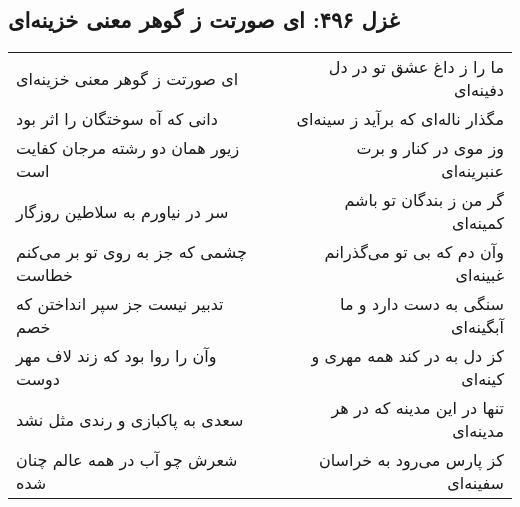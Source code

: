 \begin{center}
\section*{غزل ۴۹۶: ای صورتت ز گوهر معنی خزینه‌ای}
\label{sec:496}
\begin{longtable}{l p{0.5cm} r}
ای صورتت ز گوهر معنی خزینه‌ای
&&
ما را ز داغ عشق تو در دل دفینه‌ای
\\
دانی که آه سوختگان را اثر بود
&&
مگذار ناله‌ای که برآید ز سینه‌ای
\\
زیور همان دو رشته مرجان کفایت است
&&
وز موی در کنار و برت عنبرینه‌ای
\\
سر در نیاورم به سلاطین روزگار
&&
گر من ز بندگان تو باشم کمینه‌ای
\\
چشمی که جز به روی تو بر می‌کنم خطاست
&&
وآن دم که بی تو می‌گذرانم غبینه‌ای
\\
تدبیر نیست جز سپر انداختن که خصم
&&
سنگی به دست دارد و ما آبگینه‌ای
\\
وآن را روا بود که زند لاف مهر دوست
&&
کز دل به در کند همه مهری و کینه‌ای
\\
سعدی به پاکبازی و رندی مثل نشد
&&
تنها در این مدینه که در هر مدینه‌ای
\\
شعرش چو آب در همه عالم چنان شده
&&
کز پارس می‌رود به خراسان سفینه‌ای
\\
\end{longtable}
\end{center}
